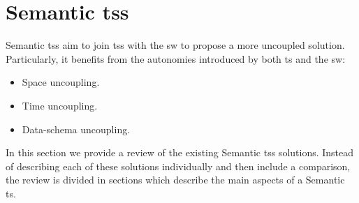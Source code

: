 \section{Semantic \aclp{ts}}
\label{sec:soa_tsc}


Semantic \aclp{ts} aim to join \aclp{ts} with the \acl{sw} to propose a more uncoupled solution.
Particularly, it benefits from the autonomies introduced by both \ac{ts} and the \ac{sw}:

\begin{itemize}
  \item Space uncoupling.
  \item Time uncoupling.
  \item Data-schema uncoupling. %
\end{itemize}


In this section we provide a review of the existing Semantic \aclp{ts} solutions. %
Instead of describing each of these solutions individually and then include a comparison,
the review is divided in sections which describe the main aspects of a Semantic \ac{ts}.




\newcommand{\midtsc}{\acs{tscm} \citep{fensel_tsc_2007}}
\newcommand{\midsws}{\acs{sws} \citep{tolksdorf_coordination_2006}}
\newcommand{\midstuples}{\acs{stuples} \citep{khushraj_stuples:_2004}}
\newcommand{\midcspaces}{\acs{cspaces} \citep{martinrecuerda_towards_2005}}
\newcommand{\midtscpp}{\acs{tscpp} \citep{krummenacher_open_2009,blunder_distributed_2009}}
\newcommand{\midtripcom}{\acs{tripcom} \citep{simperl_coordination_2007}}
\newcommand{\midsmartmt}{\acs{smartm3} \citep{honkola_smart-m3_2010}}
\newcommand{\midnardini}{\citet{nardini_semantic_2013}}


